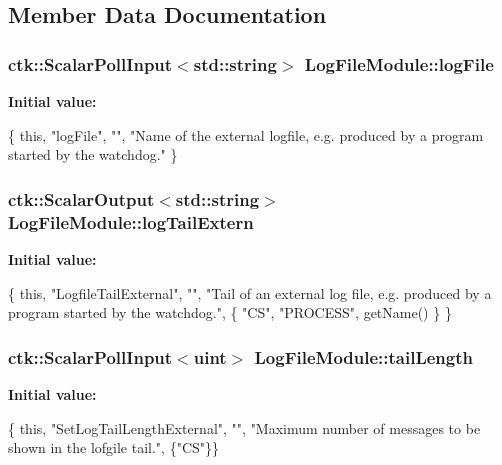 \subsection{Member Data Documentation}
\subsubsection[{\texorpdfstring{log\+File}{logFile}}]{\setlength{\rightskip}{0pt plus 5cm}ctk\+::\+Scalar\+Poll\+Input$<$std\+::string$>$ Log\+File\+Module\+::log\+File}\hypertarget{structLogFileModule_aae277497447f33b30aceb136cc412344}{}\label{structLogFileModule_aae277497447f33b30aceb136cc412344}
{\bfseries Initial value\+:}
\begin{DoxyCode}
\{ \textcolor{keyword}{this}, \textcolor{stringliteral}{"logFile"}, \textcolor{stringliteral}{""},
    \textcolor{stringliteral}{"Name of the external logfile, e.g. produced by a program started by the watchdog."} \}
\end{DoxyCode}
\subsubsection[{\texorpdfstring{log\+Tail\+Extern}{logTailExtern}}]{\setlength{\rightskip}{0pt plus 5cm}ctk\+::\+Scalar\+Output$<$std\+::string$>$ Log\+File\+Module\+::log\+Tail\+Extern}\hypertarget{structLogFileModule_afef78b1e59ea66aeb8196dd4965981a0}{}\label{structLogFileModule_afef78b1e59ea66aeb8196dd4965981a0}
{\bfseries Initial value\+:}
\begin{DoxyCode}
\{ \textcolor{keyword}{this}, \textcolor{stringliteral}{"LogfileTailExternal"}, \textcolor{stringliteral}{""},
    \textcolor{stringliteral}{"Tail of an external log file, e.g. produced by a program started by the watchdog."},
    \{ \textcolor{stringliteral}{"CS"}, \textcolor{stringliteral}{"PROCESS"}, getName() \} \}
\end{DoxyCode}
\subsubsection[{\texorpdfstring{tail\+Length}{tailLength}}]{\setlength{\rightskip}{0pt plus 5cm}ctk\+::\+Scalar\+Poll\+Input$<$uint$>$ Log\+File\+Module\+::tail\+Length}\hypertarget{structLogFileModule_a25e22dfe0545049073115281bf8ac9aa}{}\label{structLogFileModule_a25e22dfe0545049073115281bf8ac9aa}
{\bfseries Initial value\+:}
\begin{DoxyCode}
\{ \textcolor{keyword}{this}, \textcolor{stringliteral}{"SetLogTailLengthExternal"}, \textcolor{stringliteral}{""},
    \textcolor{stringliteral}{"Maximum number of messages to be shown in the lofgile tail."}, \{\textcolor{stringliteral}{"CS"}\}\}
\end{DoxyCode}
